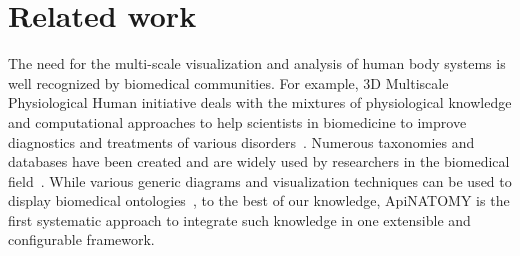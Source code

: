 \section{Related work} \label{sect:relatedWork}                                          %

The need for the multi-scale visualization and analysis of human body systems is well recognized by biomedical communities. For example,
3D Multiscale Physiological Human initiative deals with the mixtures of physiological knowledge and computational approaches to help scientists in biomedicine to improve diagnostics and treatments of various disorders~\cite{MRC09,Mag09}.
Numerous taxonomies and databases have been created and are widely used by researchers in the biomedical field~\cite{BDB08}.
While various generic diagrams and visualization techniques can be used to display biomedical ontologies~\cite{KHL+07}, to the best of our knowledge, ApiNATOMY is the first systematic approach to integrate such knowledge in one extensible and configurable framework.

